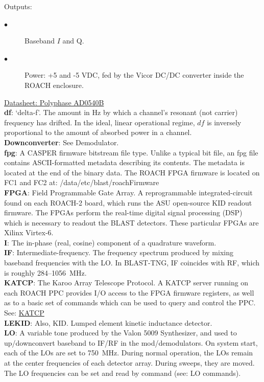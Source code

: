 Outputs:
\begin{description}
  \item[$\bullet$] Baseband $I$ and Q.
  \item[$\bullet$] Power: +5 and -5 VDC, fed by the Vicor DC/DC converter inside the ROACH enclosure.
\end{description}
\href{https://polyphasemicrowave.com/media/AD0540B.pdf}{Datasheet: Polyphase AD0540B}\\
\textbf{df}: ‘delta-f’. The amount in Hz by which a channel’s resonant (not carrier) frequency has drifted. In the ideal, linear operational regime, $df$ is inversely proportional to the amount of absorbed power in a channel.\\
\textbf{Downconverter}: See Demodulator. \\
\textbf{fpg}: A CASPER firmware bitstream file type. Unlike a typical bit file, an fpg file contains ASCII-formatted metadata describing its contents. The metadata is located at the end of the binary data. The ROACH FPGA firmware is located on FC1 and FC2 at: /data/etc/blast/roachFirmware\\
\textbf{FPGA}: Field Programmable Gate Array. A reprogrammable integrated-circuit found on each ROACH-2 board, which runs the ASU open-source KID readout firmware. The FPGAs perform the real-time digital signal processing (DSP) which is necessary to readout the BLAST detectors. These particular FPGAs are Xilinx Virtex-6.\\
\textbf{I}: The in-phase (real, cosine) component of a quadrature waveform.\\
\textbf{IF}: Intermediate-frequency. The frequency spectrum produced by mixing baseband frequencies with the LO\@. In BLAST-TNG, IF coincides with RF, which is roughly 284--1056~MHz.\\
\textbf{KATCP}: The Karoo Array Telescope Protocol. A KATCP server running on each ROACH PPC provides I/O access to the FPGA firmware registers, as well as to a basic set of commands which can be used to query and control the PPC.\\
See: \href{https://casper.ssl.berkeley.edu/wiki/KATCP}{KATCP}\\
\textbf{LEKID}: Also, KID\@. Lumped element kinetic inductance detector.\\
\textbf{LO}: A variable tone produced by the Valon 5009 Synthesizer, and used to up/downconvert baseband to IF/RF in the mod/demodulators. On system start, each of the LOs are set to 750~MHz. During normal operation, the LOs remain at the center frequencies of each detector array. During sweeps, they are moved. The LO frequencies can be set and read by command (see: LO commands).\\
